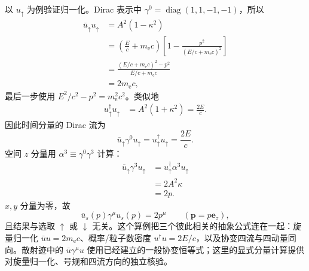 \begin{exbox}[沿 $z$ 方向运动的电子]
以 $u_\uparrow$ 为例验证归一化。Dirac 表示中 $\gamma^0=\operatorname{diag}(1,1,-1,-1)$，所以
\begin{align*}
 \bar u_\uparrow u_\uparrow
 &=A^2(1-\kappa^2)\\
 &=\left(\frac Ec+m_{\mathrm e} c\right)
 \left[1-\frac{p^2}{(E/c+m_{\mathrm e} c)^2}\right]\\
 &=\frac{(E/c+m_{\mathrm e} c)^2-p^2}{E/c+m_{\mathrm e} c}\\
 &=2m_{\mathrm e} c,
\end{align*}
最后一步使用 $E^2/c^2-p^2=m_{\mathrm e}^2c^2$。类似地
\begin{align*}
 u_\uparrow^\dagger u_\uparrow
 &=A^2(1+\kappa^2)
 =\frac{2E}{c}.
\end{align*}
因此时间分量的 Dirac 流为
\begin{equation*}
 \bar u_\uparrow\gamma^0u_\uparrow
 =u_\uparrow^\dagger u_\uparrow
 =\frac{2E}{c}.
\end{equation*}
空间 $z$ 分量用 $\alpha^3\equiv\gamma^0\gamma^3$ 计算：
\begin{align*}
 \bar u_\uparrow\gamma^3u_\uparrow
 &=u_\uparrow^\dagger\alpha^3u_\uparrow\\
 &=2A^2\kappa\\
 &=2p.
\end{align*}
$x,y$ 分量为零，故
\begin{equation}
 \boxed{\bar u_s(p)\gamma^\mu u_s(p)=2p^\mu}
 \qquad(\mathbf p=p\mathbf e_z),
 \label{eq:explicit-dirac-current-z-dp62}
\end{equation}
且结果与选取 $\uparrow$ 或 $\downarrow$ 无关。这个算例把三个彼此相关的抽象公式连在一起：旋量归一化 $\bar uu=2m_{\mathrm e} c$、概率/粒子数密度 $u^\dagger u=2E/c$，以及协变四流与四动量同向。散射迹中的 $\bar u\gamma^\mu u$ 使用已经建立的一般协变恒等式；这里的显式分量计算提供对旋量归一化、号规和四流方向的独立核验。
\end{exbox}

